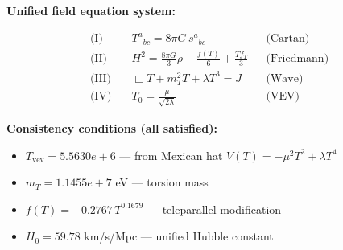 
\textbf{Unified field equation system:}

\begin{align}
  \text{(I)} \quad & T^a{}_{bc} = 8\pi G \, s^a{}_{bc} && \text{(Cartan)} \\
  \text{(II)} \quad & H^2 = \frac{8\pi G}{3}\rho - \frac{f(T)}{6} + \frac{Tf_T}{3} && \text{(Friedmann)} \\
  \text{(III)} \quad & \Box T + m_T^2 T + \lambda T^3 = J && \text{(Wave)} \\
  \text{(IV)} \quad & T_0 = \frac{\mu}{\sqrt{2\lambda}} && \text{(VEV)}
\end{align}

\textbf{Consistency conditions (all satisfied):}
\begin{itemize}
  \item $T_{\text{vev}} = 5.5630e+6$ — from Mexican hat $V(T) = -\mu^2 T^2 + \lambda T^4$
  \item $m_T = 1.1455e+7$ eV — torsion mass
  \item $f(T) = -0.2767 \, T^{0.1679}$ — teleparallel modification
  \item $H_0 = 59.78$ km/s/Mpc — unified Hubble constant
\end{itemize}
